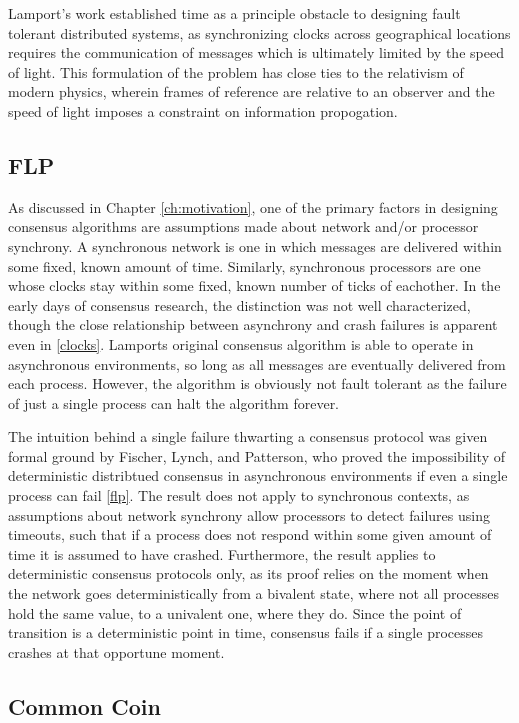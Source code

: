 Lamport's work established time as a principle obstacle to designing fault tolerant distributed systems,
as synchronizing clocks across geographical locations requires the communication of messages 
which is ultimately limited by the speed of light.
This formulation of the problem has close ties to the relativism of modern physics,
wherein frames of reference are relative to an observer and the speed of light imposes a constraint on information propogation.

\subsection{FLP}
As discussed in Chapter \ref{ch:motivation}, 
one of the primary factors in designing consensus algorithms are assumptions made about 
network and/or processor synchrony. 
A synchronous network is one in which messages are delivered within some fixed, 
known amount of time. 
Similarly, synchronous processors are one whose clocks stay within some fixed, 
known number of ticks of eachother.
In the early days of consensus research, the distinction was not well characterized, 
though the close relationship between asynchrony and crash failures is apparent even in \ref{clocks}.
Lamports original consensus algorithm is able to operate in asynchronous environments, 
so long as all messages are eventually delivered from each process.
However, the algorithm is obviously not fault tolerant as the failure of just a single process can halt the algorithm forever.

The intuition behind a single failure thwarting a consensus protocol was given formal ground by Fischer, Lynch, and Patterson,
who proved the impossibility of deterministic distribtued consensus in asynchronous environments if even a single process can fail \ref{flp}.
The result does not apply to synchronous contexts, 
as assumptions about network synchrony allow processors to detect failures using timeouts, 
such that if a process does not respond within some given amount of time it is assumed to have crashed.
Furthermore, the result applies to deterministic consensus protocols only, 
as its proof relies on the moment when the network goes deterministically from a bivalent state, 
where not all processes hold the same value, to a univalent one, where they do.
Since the point of transition is a deterministic point in time, 
consensus fails if a single processes crashes at that opportune moment.

\subsection{Common Coin}

